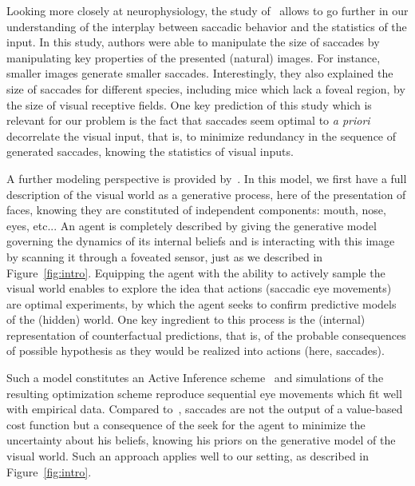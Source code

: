 Looking more closely at neurophysiology, the study of~\citep{Samonds18} allows to go further in our understanding of the interplay between saccadic behavior and the statistics of the input. In this study, authors were able to manipulate the size of saccades by manipulating key properties of the presented (natural) images. For instance, smaller images generate smaller saccades. Interestingly, they also explained the size of saccades for different species, including mice which lack a foveal region, by the size of visual receptive fields. One key prediction of this study which is relevant for our problem is the fact that saccades seem optimal to \emph{a priori} decorrelate the visual input, that is, to minimize redundancy in the sequence of generated saccades, knowing the statistics of visual inputs.

A further modeling perspective is provided by~\citep{Friston12}. In this model, we first have a full description of the visual world as a generative process, here of the presentation of faces, knowing they are constituted of independent components: mouth, nose, eyes, etc... An agent is completely described by giving the generative model governing the dynamics of its internal beliefs and is interacting with this image by scanning it through a foveated sensor, just as we described in Figure~\ref{fig:intro}. Equipping the agent with the ability to actively sample the visual world enables to explore the idea that actions (saccadic eye movements) are optimal experiments, by which the agent seeks to confirm predictive models of the (hidden) world. One key ingredient to this process is the (internal) representation of counterfactual predictions, that is, of the probable consequences of possible hypothesis as they would be realized into actions (here, saccades).

Such a model constitutes an Active Inference scheme~\citep{Mirza18} and simulations of the resulting optimization scheme reproduce sequential eye movements which fit well with empirical data. Compared to~\citet{Najemnik05}, saccades are not the output of a value-based cost function but a consequence of the seek for the agent to minimize the uncertainty about his beliefs, knowing his priors on the generative model of the visual world. Such an approach applies well to our setting, as described in Figure~\ref{fig:intro}. 



